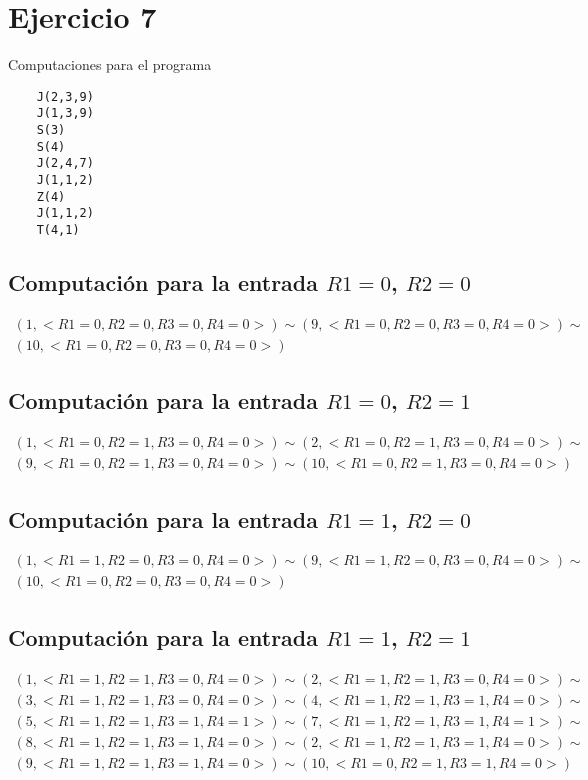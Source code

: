 \section{Ejercicio 7}
	Computaciones para el programa
	\begin{verbatim}
	J(2,3,9)
	J(1,3,9)
	S(3)
	S(4)
	J(2,4,7)
	J(1,1,2)
	Z(4)
	J(1,1,2)
	T(4,1)
	\end{verbatim}
	\subsection{Computación para la entrada $R1=0$, $R2=0$}
	\begin{equation*}\begin{gathered}
	(1, <R1=0, R2=0, R3=0, R4=0>) \sim (9, <R1=0, R2=0, R3=0, R4=0>) \sim\\
	(10, <R1=0, R2=0, R3=0, R4=0>)
	\end{gathered}\end{equation*}
	\subsection{Computación para la entrada $R1=0$, $R2=1$}
	\begin{equation*}\begin{gathered}
	(1, <R1=0, R2=1, R3=0, R4=0>) \sim (2, <R1=0, R2=1, R3=0, R4=0>) \sim\\
	(9, <R1=0, R2=1, R3=0, R4=0>) \sim (10, <R1=0, R2=1, R3=0, R4=0>)
	\end{gathered}\end{equation*}
	\subsection{Computación para la entrada $R1=1$, $R2=0$}
	\begin{equation*}\begin{gathered}
	(1, <R1=1, R2=0, R3=0, R4=0>) \sim (9, <R1=1, R2=0, R3=0, R4=0>) \sim\\
	(10, <R1=0, R2=0, R3=0, R4=0>)
	\end{gathered}\end{equation*}
	\subsection{Computación para la entrada $R1=1$, $R2=1$}
	\begin{equation*}\begin{gathered}
	(1, <R1=1, R2=1, R3=0, R4=0>) \sim (2, <R1=1, R2=1, R3=0, R4=0>) \sim\\
	(3, <R1=1, R2=1, R3=0, R4=0>) \sim (4, <R1=1, R2=1, R3=1, R4=0>) \sim\\
	(5, <R1=1, R2=1, R3=1, R4=1>) \sim (7, <R1=1, R2=1, R3=1, R4=1>) \sim\\
	(8, <R1=1, R2=1, R3=1, R4=0>) \sim (2, <R1=1, R2=1, R3=1, R4=0>) \sim\\
	(9, <R1=1, R2=1, R3=1, R4=0>) \sim (10, <R1=0, R2=1, R3=1, R4=0>)
	\end{gathered}\end{equation*}
